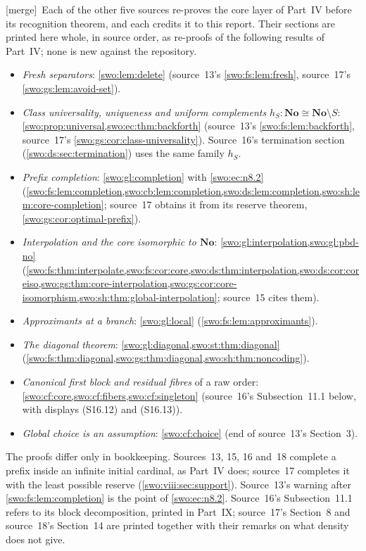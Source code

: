 \documentclass[11pt]{article}
\theoremstyle{definition}
\theoremstyle{remark}
\newcommand{\No}{\mathbf{No}}
\newcommand{\merge}{\textsf{[merge]}}
\begin{document}
\merge\ Each of the other five sources re-proves the core layer of Part~IV
before its recognition theorem, and each credits it to this report. Their
sections are printed here whole, in source order, as re-proofs of the
following results of Part~IV; none is new against the repository.
\begin{itemize}
\item \emph{Fresh separators}: \cref{swo:lem:delete} (source~13's
\cref{swo:fs:lem:fresh}, source~17's \cref{swo:gs:lem:avoid-set}).
\item \emph{Class universality, uniqueness and uniform complements}
$h_S:\No\cong\No\setminus S$: \cref{swo:prop:universal,swo:ec:thm:backforth}
(source~13's \cref{swo:fs:lem:backforth}, source~17's
\cref{swo:gs:cor:class-universality}). Source~16's termination section
(\cref{swo:ds:sec:termination}) uses the same family $h_S$.
\item \emph{Prefix completion}: \cref{swo:gl:completion} with
\cref{swo:ec:n8.2} (\cref{swo:fs:lem:completion,swo:cb:lem:completion,swo:ds:lem:completion,swo:sh:lem:core-completion};
source~17 obtains it from its reserve theorem, \cref{swo:gs:cor:optimal-prefix}).
\item \emph{Interpolation and the core isomorphic to $\No$}:
\cref{swo:gl:interpolation,swo:gl:pbd-no}
(\cref{swo:fs:thm:interpolate,swo:fs:cor:core,swo:ds:thm:interpolation,swo:ds:cor:coreiso,swo:gs:thm:core-interpolation,swo:gs:cor:core-isomorphism,swo:sh:thm:global-interpolation};
source~15 cites them).
\item \emph{Approximants at a branch}: \cref{swo:gl:local}
(\cref{swo:fs:lem:approximants}).
\item \emph{The diagonal theorem}: \cref{swo:gl:diagonal,swo:st:thm:diagonal}
(\cref{swo:fs:thm:diagonal,swo:gs:thm:diagonal,swo:sh:thm:noncoding}).
\item \emph{Canonical first block and residual fibres} of a raw order:
\cref{swo:cf:core,swo:cf:fibers,swo:cf:singleton} (source~16's
Subsection~11.1 below, with displays (S16.12) and (S16.13)).
\item \emph{Global choice is an assumption}: \cref{swo:cf:choice} (end of
source~13's Section~3).
\end{itemize}
The proofs differ only in bookkeeping. Sources~13, 15, 16 and~18 complete a
prefix inside an infinite initial cardinal, as Part~IV does; source~17
completes it with the least possible reserve (\cref{swo:viii:sec:support}).
Source~13's warning after \cref{swo:fs:lem:completion} is the point of
\cref{swo:ec:n8.2}. Source~16's Subsection~11.1 refers to its block
decomposition, printed in Part~IX; source~17's Section~8 and source~18's
Section~14 are printed together with their remarks on what density does not
give.
\end{document}
